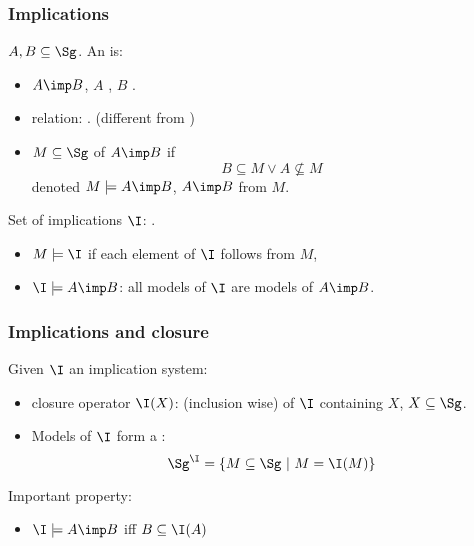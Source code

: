 \begin{frame}
\frametitle{Implications}

$A, B \subseteq \Sg$. An  is:
\begin{itemize}
	\item $A \imp B$, $A$ , $B$ .
	\item relation: . (different from 
	)
	\item $M \subseteq \Sg$  of $A \imp B$ if
	\[B \subseteq M \lor A \nsubseteq M \]
	denoted $M \models A \imp B$, $A \imp B$  from $M$.
\end{itemize}

\vspace{0.5em}

Set of implications $\I$: .
\begin{itemize}
	\item $M \models \I$ if each element of $\I$ follows from $M$,
	\item $\I \models A \imp B$: all models of $\I$ are models of $A \imp B$.
\end{itemize}

\end{frame}


\begin{frame}
\frametitle{Implications and closure}

Given $\I$ an implication system:
\begin{itemize}
\item closure operator $\I(X)$:  (inclusion wise) of 
$\I$ containing $X$, $X \subseteq \Sg$. 
\item Models of $\I$ form a :
\[ \Sg^{\I} = \{ M \subseteq \Sg \ | \ M = \I(M) \} \]
\end{itemize}

\vspace{1.2em}

\begin{lightreminder}
Important property:
\begin{itemize}
	\item $\I \models A \imp B$ iff $B \subseteq \I(A)$
\end{itemize}
\end{lightreminder}

\end{frame}

